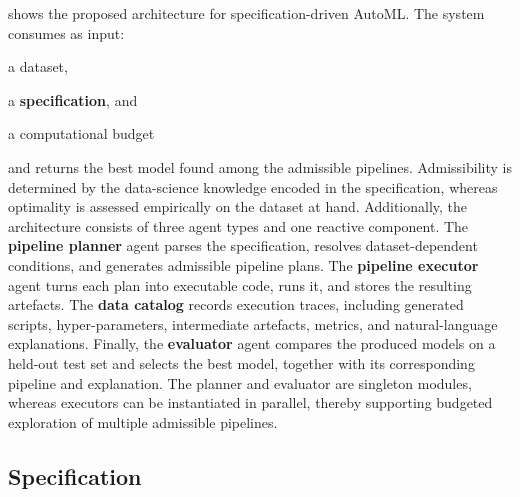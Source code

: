 \documentclass[runningheads]{llncs}
\newenvironment{inlinelist}{\begin{enumerate*}[label=\emph{(\roman*)}]}{\end{enumerate*}}
\begin{document}
 shows the proposed architecture for specification-driven \ac{AutoML}.
%
The system consumes as input:
\begin{inlinelist}
  \item a dataset,
  \item a \textbf{specification}, %
  and
  \item a computational budget
\end{inlinelist}
and returns the best model found among the admissible pipelines.
%
Admissibility is determined by the data-science knowledge encoded in the specification,
whereas optimality is assessed empirically on the dataset at hand.
%
Additionally, the architecture consists of three agent types and one reactive component.
%
The \textbf{pipeline planner} agent parses the specification,
resolves dataset-dependent conditions,
and generates admissible pipeline plans.
%
The \textbf{pipeline executor} agent turns each plan into executable code,
runs it,
and stores the resulting artefacts.
%
The \textbf{data catalog} records execution traces,
including generated scripts,
hyper-parameters,
intermediate artefacts,
metrics,
and natural-language explanations.
%
Finally,
the \textbf{evaluator} agent compares the produced models on a held-out test set
and selects the best model,
together with its corresponding pipeline and explanation.
%
The planner and evaluator are singleton modules,
whereas executors can be instantiated in parallel,
thereby supporting budgeted exploration of multiple admissible pipelines.

\subsection{Specification}
\label{subsec:specification}
\end{document}
